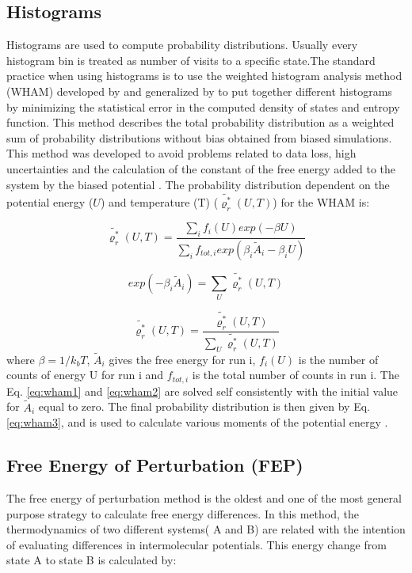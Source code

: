 \subsection{Histograms}
Histograms are used  to compute probability distributions. Usually every histogram bin is treated as number of visits to a specific state.The standard practice when using histograms is to use the weighted histogram analysis method (WHAM) developed by  and generalized by  \cite{freeenergy} to put together different histograms by minimizing the statistical error in the computed density of states and entropy function. This method describes the total probability distribution as a weighted sum of probability distributions without bias  obtained from biased simulations. This method was developed to avoid problems related to data loss, high uncertainties and the calculation of the constant of the free energy added to the system by the biased potential \cite{ROUX1995275}. The probability distribution dependent on the potential energy ($U$) and temperature (T) ($\tilde{\varrho_{r}^{*}}(U,T)$) for the WHAM is:

\begin{equation}
\label{eq:wham1}
\tilde{\varrho_{r}^{*}}(U,T) = \frac{\sum_{i} f_{i}(U) exp(- \beta U)}{\sum_{i} f_{tot,i} exp(\beta _{i} \tilde{A}_{i} -\beta _{i} U) }
\end{equation} 

\begin{equation}
\label{eq:wham2}
exp(- \beta _{i} \tilde{A}_{i}) = \sum_{U} \tilde{\varrho_{r}^{*}}(U,T) 
\end{equation}

\begin{equation}
\label{eq:wham3}
\tilde{\varrho_{r}^{*}}(U,T) = \frac{\tilde{\varrho_{r}^{*}}(U,T)}{\sum_{U} \tilde{\varrho_{r}^{*}}(U,T)}
\end{equation} 
where $\beta = 1/k_{b}T$, $\tilde{A}_{i}$ gives the free energy for run i, $f_{i}(U)$ is the number of counts of energy U for run i and $f_{tot,i}$ is the total number of counts in run i. The Eq. \eqref{eq:wham1} and \eqref{eq:wham2} are solved self consistently with the initial value for $\tilde{A}_{i}$ equal to zero. The final probability distribution is then given by Eq. \eqref{eq:wham3}, and is used to calculate various moments of the potential energy \cite{freeenergy}.


\subsection{Free Energy of Perturbation (FEP)}
The free energy of perturbation method \cite{zwanzig1954} is the oldest and one of the most general purpose strategy to calculate free energy differences. In this method, the thermodynamics of two different systems( A and B) are related with the intention of evaluating differences in intermolecular potentials. This energy change from state A to state B is calculated by:  


